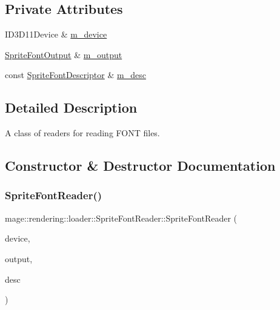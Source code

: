 \subsection*{Private Attributes}
\begin{DoxyCompactItemize}
\item 
I\+D3\+D11\+Device \& \hyperlink{classmage_1_1rendering_1_1loader_1_1_sprite_font_reader_a2d152614490f697a9d737aae446a84c9}{m\+\_\+device}
\item 
\hyperlink{structmage_1_1rendering_1_1_sprite_font_output}{Sprite\+Font\+Output} \& \hyperlink{classmage_1_1rendering_1_1loader_1_1_sprite_font_reader_ab14aaeb914ddc7f448ae8fe5ce021d3a}{m\+\_\+output}
\item 
const \hyperlink{classmage_1_1rendering_1_1_sprite_font_descriptor}{Sprite\+Font\+Descriptor} \& \hyperlink{classmage_1_1rendering_1_1loader_1_1_sprite_font_reader_af346b7f0f090f5c9994d60684ccb5960}{m\+\_\+desc}
\end{DoxyCompactItemize}


\subsection{Detailed Description}
A class of readers for reading F\+O\+NT files. 

\subsection{Constructor \& Destructor Documentation}
\hypertarget{classmage_1_1rendering_1_1loader_1_1_sprite_font_reader_a5cef04ca33ef0047664fa757de6e1b8f}{}\label{classmage_1_1rendering_1_1loader_1_1_sprite_font_reader_a5cef04ca33ef0047664fa757de6e1b8f} 
\subsubsection{\texorpdfstring{Sprite\+Font\+Reader()}{SpriteFontReader()}\hspace{0.1cm}{\footnotesize\ttfamily [1/3]}}
{\footnotesize\ttfamily mage\+::rendering\+::loader\+::\+Sprite\+Font\+Reader\+::\+Sprite\+Font\+Reader (\begin{DoxyParamCaption}\item[{I\+D3\+D11\+Device \&}]{device,  }\item[{\hyperlink{structmage_1_1rendering_1_1_sprite_font_output}{Sprite\+Font\+Output} \&}]{output,  }\item[{const \hyperlink{classmage_1_1rendering_1_1_sprite_font_descriptor}{Sprite\+Font\+Descriptor} \&}]{desc }\end{DoxyParamCaption})\hspace{0.3cm}{\ttfamily [explicit]}}

